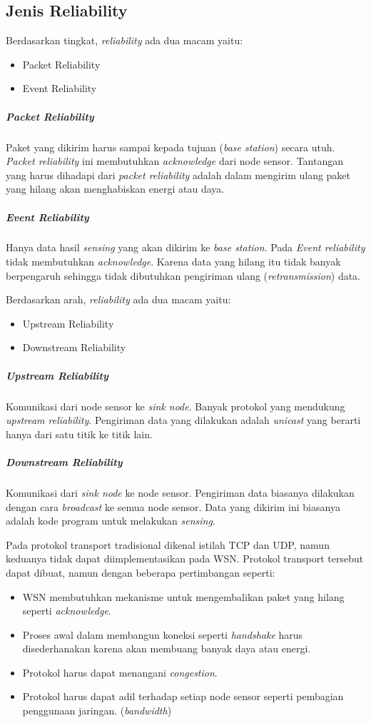 \subsection{Jenis Reliability}
Berdasarkan tingkat, \textit{reliability} ada dua macam yaitu:
\begin{itemize}
	\item Packet Reliability
	\item Event Reliability
\end{itemize}  
\subparagraph{Packet Reliability} Paket yang dikirim harus sampai kepada tujuan (\textit{base station}) secara utuh. \textit{Packet reliability} ini membutuhkan \textit{acknowledge} dari node sensor. Tantangan yang harus dihadapi dari \textit{packet reliability} adalah dalam mengirim ulang paket yang hilang akan menghabiskan energi atau daya.
\subparagraph{Event Reliability} Hanya data hasil \textit{sensing} yang akan dikirim ke \textit{base station}. Pada \textit{Event reliability} tidak membutuhkan \textit{acknowledge}. Karena data yang hilang itu tidak banyak berpengaruh sehingga tidak dibutuhkan pengiriman ulang (\textit{retransmission}) data.
\newline

Berdasarkan arah, \textit{reliability} ada dua macam yaitu:
\begin{itemize}
	\item Upstream Reliability
	\item Downstream Reliability
\end{itemize}
\subparagraph{Upstream Reliability} Komunikasi dari node sensor ke \textit{sink node}. Banyak protokol yang mendukung \textit{upstream reliability}. Pengiriman data yang dilakukan adalah \textit{unicast} yang berarti hanya dari satu titik ke titik lain.
\subparagraph{Downstream Reliability} Komunikasi dari \textit{sink node} ke node sensor. Pengiriman data biasanya dilakukan dengan cara \textit{broadcast} ke semua node sensor. Data yang dikirim ini biasanya adalah kode program untuk melakukan \textit{sensing}. 
\newline

Pada protokol transport tradisional dikenal istilah TCP dan UDP, namun keduanya tidak dapat diimplementasikan pada WSN. Protokol transport tersebut dapat dibuat, namun dengan beberapa pertimbangan seperti:
\begin{itemize}
	\item WSN membutuhkan mekanisme untuk mengembalikan paket yang hilang seperti \textit{acknowledge}.
	\item Proses awal dalam membangun koneksi seperti \textit{handshake} harus disederhanakan karena akan membuang banyak daya atau energi.
	\item Protokol harus dapat menangani \textit{congestion}.
	\item Protokol harus dapat adil terhadap setiap node sensor seperti pembagian penggunaan jaringan. (\textit{bandwidth})
\end{itemize} 

